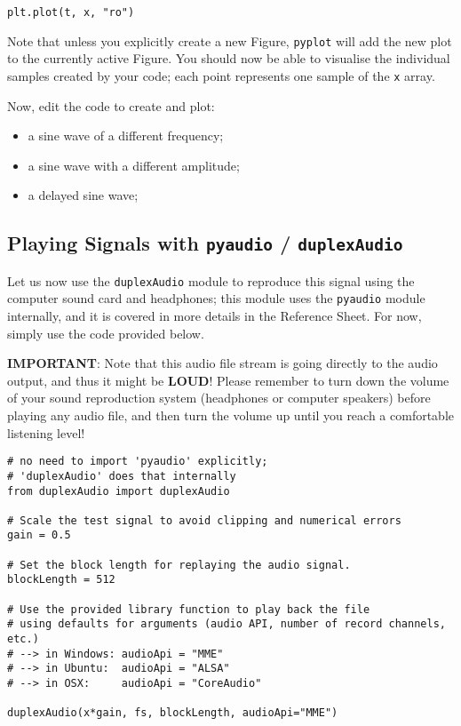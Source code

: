 \begin{lstlisting}[frame=single]
plt.plot(t, x, "ro")
\end{lstlisting}

Note that unless you explicitly create a new Figure, {\tt pyplot} will add the new plot to the currently active Figure. You should now be able to visualise the individual samples created by your code; each point represents one sample of the {\tt x} array.

Now, edit the code to create and plot:

\begin{itemize}
	\item a sine wave of a different frequency;
	\item a sine wave with a different amplitude;
	\item a delayed sine wave;
\end{itemize}

\subsection{Playing Signals with {\tt pyaudio} / {\tt duplexAudio}}

Let us now use the {\tt duplexAudio} module to reproduce this signal using the computer sound card and headphones; this module uses the {\tt pyaudio} module internally, and it is covered in more details in the Reference Sheet. For now, simply use the code provided below.

\textbf{IMPORTANT}: Note that this audio file stream is going directly to the audio output, and thus it might be \textbf{LOUD}! Please remember to turn down the volume of your sound reproduction system (headphones or computer speakers) before playing any audio file, and then turn the volume up until you reach a comfortable listening level!

\begin{lstlisting}[frame=single]
# no need to import 'pyaudio' explicitly;
# 'duplexAudio' does that internally
from duplexAudio import duplexAudio

# Scale the test signal to avoid clipping and numerical errors
gain = 0.5

# Set the block length for replaying the audio signal.
blockLength = 512

# Use the provided library function to play back the file
# using defaults for arguments (audio API, number of record channels, etc.)
# --> in Windows: audioApi = "MME"
# --> in Ubuntu:  audioApi = "ALSA"
# --> in OSX:     audioApi = "CoreAudio"

duplexAudio(x*gain, fs, blockLength, audioApi="MME")
\end{lstlisting}

